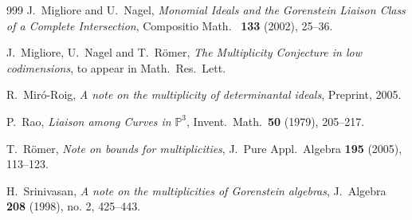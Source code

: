 \documentclass[12pt,twoside]{amsart}
\numberwithin{equation}{section}
\newcommand {\PP}{\mathbb{P}}
\theoremstyle{definition}
\begin{document}
\begin{thebibliography}{999}
 J.\ Migliore and U.\ Nagel, {\em Monomial Ideals and the
Gorenstein Liaison Class of a Complete Intersection}, Compositio Math.\ {\bf
133} (2002), 25--36.

 J.\ Migliore, U.\ Nagel and T.\ R\"omer, {\em The Multiplicity
Conjecture in low codimensions}, to appear in Math.\ Res.\ Lett.

 R.\ Mir\'o-Roig, {\em A note on the multiplicity of determinantal ideals},
Preprint, 2005.

 P.\ Rao, {\em Liaison among Curves in} $\PP^3$, Invent.\ Math.\
{\bf 50} (1979), 205--217.

 T.\ R\"omer, {\em Note on bounds for multiplicities}, J.\ Pure Appl.\
Algebra  {\bf 195}  (2005), 113--123.

 H.\ Srinivasan, {\em A note on the multiplicities of
Gorenstein algebras}, J.\ Algebra {\bf 208} (1998), no. 2, 425--443.


\end{thebibliography}
\end{document}
